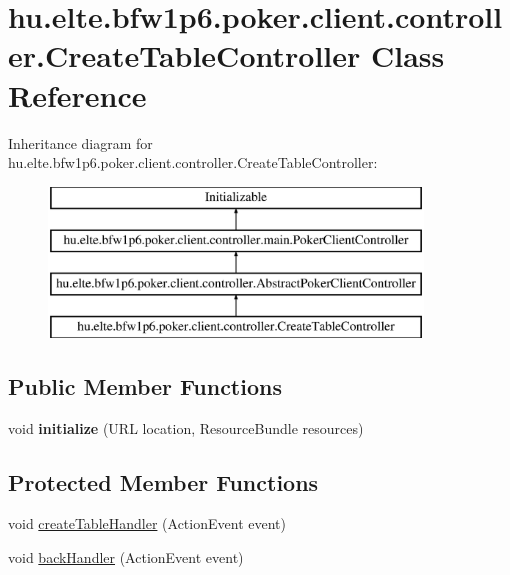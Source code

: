 \hypertarget{classhu_1_1elte_1_1bfw1p6_1_1poker_1_1client_1_1controller_1_1_create_table_controller}{}\section{hu.\+elte.\+bfw1p6.\+poker.\+client.\+controller.\+Create\+Table\+Controller Class Reference}
\label{classhu_1_1elte_1_1bfw1p6_1_1poker_1_1client_1_1controller_1_1_create_table_controller}
Inheritance diagram for hu.\+elte.\+bfw1p6.\+poker.\+client.\+controller.\+Create\+Table\+Controller\+:\begin{figure}[H]
\begin{center}
\leavevmode
\includegraphics[height=4.000000cm]{classhu_1_1elte_1_1bfw1p6_1_1poker_1_1client_1_1controller_1_1_create_table_controller}
\end{center}
\end{figure}
\subsection*{Public Member Functions}
\begin{DoxyCompactItemize}
\item 
\hypertarget{classhu_1_1elte_1_1bfw1p6_1_1poker_1_1client_1_1controller_1_1_create_table_controller_a2ef951179e744ac8f28c6d48a9655613}{}void {\bfseries initialize} (U\+R\+L location, Resource\+Bundle resources)\label{classhu_1_1elte_1_1bfw1p6_1_1poker_1_1client_1_1controller_1_1_create_table_controller_a2ef951179e744ac8f28c6d48a9655613}

\end{DoxyCompactItemize}
\subsection*{Protected Member Functions}
\begin{DoxyCompactItemize}
\item 
void \hyperlink{classhu_1_1elte_1_1bfw1p6_1_1poker_1_1client_1_1controller_1_1_create_table_controller_a391f236c75edb989905c4d5dbdbe2b86}{create\+Table\+Handler} (Action\+Event event)
\item 
void \hyperlink{classhu_1_1elte_1_1bfw1p6_1_1poker_1_1client_1_1controller_1_1_create_table_controller_a859bc32fc9683dad7da3f00bf2e242aa}{back\+Handler} (Action\+Event event)
\end{DoxyCompactItemize}
